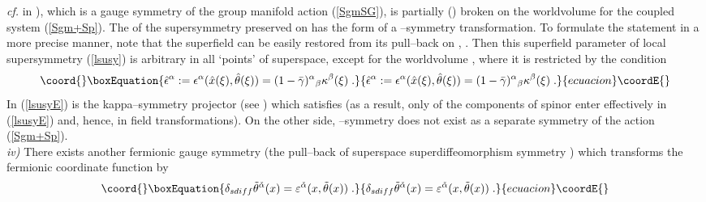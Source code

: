\documentclass[a4paper,11pt]{article}
\begin{document}
{\it cf.} \coordHE{} in \cite{BdAI1}), 
which is a gauge symmetry of the group manifold action (\ref{SgmSG}), 
is partially (\coordHE{}) broken on the worldvolume \coordHE{} 
for the coupled  system (\ref{Sgm+Sp}). The 
\coordHE{} of the supersymmetry preserved on \coordHE{} has the form 
of a \myHighlight{$\kappa$}\coordHE{}--symmetry transformation. To formulate the statement in 
a more precise manner, note that 
the superfield \coordHE{} can be easily restored 
from its pull--back on \coordHE{}, \coordHE{}. Then this superfield 
parameter of local supersymmetry (\ref{lsusy}) is arbitrary in all 
`points' of  superspace, except for the worldvolume \coordHE{}, 
where  it  is restricted by the condition 
\begin{equation}\coord{}\boxEquation{
  \label{lsusyE} 
\hat{\epsilon}^{\alpha}:= \epsilon^{\alpha}(\hat{x}(\xi), \hat{\theta}(\xi)) 
= (1-\bar{\gamma})^{\alpha}{}_{\beta}\kappa^{\beta}(\xi) \; . 
}{
  \hat{\epsilon}^{\alpha}:= \epsilon^{\alpha}(\hat{x}(\xi), \hat{\theta}(\xi)) 
= (1-\bar{\gamma})^{\alpha}{}_{\beta}\kappa^{\beta}(\xi) \; . 
}{ecuacion}\coordE{}\end{equation}
In (\ref{lsusyE})   
 \myHighlight{$\bar{\gamma}^{\alpha}{}_{\beta}$}\coordHE{} is the kappa--symmetry projector 
(see \cite{AETW}) which satisfies 
\coordHE{} (as a result, only \coordHE{} of the 
components of spinor \myHighlight{$\kappa^{\beta}(\tau)$}\coordHE{} enter effectively in 
(\ref{lsusyE}) and, hence, in field transformations).
On the other side, \myHighlight{$\kappa$}\coordHE{}--symmetry does not exist
as a separate symmetry of the action (\ref{Sgm+Sp}). 
\\ {\it iv)}  There exists another fermionic gauge symmetry 
(the pull--back of superspace superdiffeomorphism symmetry  
\cite{BdAI1}) 
which transforms the fermionic coordinate function by 
 \begin{equation}\coord{}\boxEquation{
  \label{sdif} 
\delta_{sdiff} \tilde{\theta}^{\check{\alpha}}(x)= 
\varepsilon^{\check{\alpha}}(x, \tilde{\theta}(x))\; .
}{
  \delta_{sdiff} \tilde{\theta}^{\check{\alpha}}(x)= 
\varepsilon^{\check{\alpha}}(x, \tilde{\theta}(x))\; .
}{ecuacion}\coordE{}\end{equation}
\end{document}
